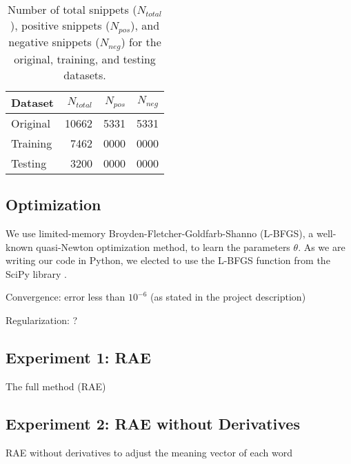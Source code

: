 \documentclass{article}
\newcommand{\ra}[1]{\renewcommand{\arraystretch}{#1}}
\begin{document}
\begin{table}[t]
    \centering

    \caption{Number of total snippets ($N_{total}$), positive snippets ($N_{pos}$), and negative snippets ($N_{neg}$) for the original, training, and testing datasets.} 
    \label{tab:datasets}

    \ra{1.2}
    \begin{tabular}{@{} l r r r  @{}}
        \\
        \toprule
        \bf{Dataset} & $N_{total}$ & $N_{pos}$ & $N_{neg}$ \\
        \midrule
        Original & 10662 & 5331 & 5331 \\
        Training &  7462 & 0000 & 0000 \\
        Testing  &  3200 & 0000 & 0000 \\
        \bottomrule
    \end{tabular}
\end{table}


%
%
\subsection{Optimization}
We use limited-memory Broyden-Fletcher-Goldfarb-Shanno (L-BFGS), a well-known quasi-Newton optimization method, to learn the parameters $\theta$. As we are writing our code in Python, we elected to use the L-BFGS function from the SciPy library \cite{scipy}.

Convergence: error less than $10^{-6}$ (as stated in the project description)

Regularization: ?


%
%
\subsection{Experiment 1: RAE}
The full method (RAE)


%
%
\subsection{Experiment 2: RAE without Derivatives}
RAE without derivatives to adjust the meaning vector of each word
\end{document}
